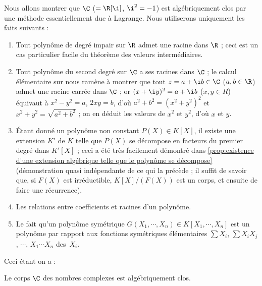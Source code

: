 \documentclass[11pt, %
  title in boldface,
  theorem in new line,
  theorem numbering = section,
  number theorems separately,
  simple name,
]{beaulivre}
\begin{document}
    Nous allons montrer que \( \C \) (\( = \R[\i] \), \( \i^2 = -1 \)) est algébriquement clos par une méthode essentiellement due à Lagrange. Nous utiliserons uniquement les faits suivants :
    \begin{enumerate}
        \item \label{faits utilisés pour montrer C est algébriquement clos;fait1} Tout polynôme de degré impair sur \( \R \) admet une racine dans \( \R \) ; ceci est un cas particulier facile du théorème des valeurs intermédiaires.
        \item \label{faits utilisés pour montrer C est algébriquement clos;fait2} Tout polynôme du second degré sur \( \C \) a ses racines dans \( \C \) ; le calcul élémentaire sur  nous ramène à montrer que tout \( z = a + \i b \in \C \) (\( a,b \in \R \)) admet une racine carrée dans \( \C \) ; or \( (x + \i y)^2 = a + \i b \) (\( x,y \in R \)) équivaut à \( x^2-y^2 = a \), \( 2xy = b \), d'où \( a^2 + b^2 = (x^2+y^2)^2 \) et \( x^2+y^2 = \sqrt{a^2 + b^2} \) ; on en déduit les valeurs de \( x^2 \) et \( y^2 \), d'où \( x \) et \( y \).
        \item \label{faits utilisés pour montrer C est algébriquement clos;fait3} Étant donné un polynôme non constant \( P(X) \in K[X] \), il existe une extension \( K' \) de \( K \) telle que \( P(X) \) se décompose en facteurs du premier degré dans \( K'[X] \) ; ceci a été très facilement démontré dans \cref{prop:existence d'une extension algébrique telle que le polynôme se décompose} (démonstration quasi indépendante de ce qui la précède ; il suffit de savoir que, si \( F(X) \) est irréductible, \( K[X]/(F(X)) \) est un corps, et ensuite de faire une récurrence).
        \item \label{faits utilisés pour montrer C est algébriquement clos;fait4} Les relations entre coefficients et racines d'un polynôme.
        \item \label{faits utilisés pour montrer C est algébriquement clos;fait5} Le fait qu'un polynôme symétrique \( G(X_1, \cdots, X_n) \in K[X_1, \cdots, X_n] \) est un polynôme par rapport aux fonctions symétriques élémentaires \( \sum X_i \), \( \sum X_i X_j \), \( \cdots \), \( X_1 \cdots X_n \) des~\( X_i \).
    \end{enumerate}
    Ceci étant on a :
    \begin{theorem*}
        Le corps \( \C \) des nombres complexes est algébriquement clos.
    \end{theorem*}
\end{document}
